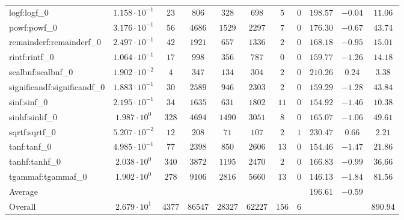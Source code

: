 \begin{tabular}{|l|c|c|c|c|c|c|c|c|c|c|}
logf:logf\_0                 & $ 1.158 \cdot 10^{-1} $ & $ 23     $ & $ 806   $ & $ 328   $ & $ 698   $ & $ 5   $ & $ 0 $ & $ 198.57      $ & $ -0.04   $ & $ 11.06   $ \\
powf:powf\_0                 & $ 3.176 \cdot 10^{-1} $ & $ 56     $ & $ 4686  $ & $ 1529  $ & $ 2297  $ & $ 7   $ & $ 0 $ & $ 176.30      $ & $ -0.67   $ & $ 43.74   $ \\
remainderf:remainderf\_0     & $ 2.497 \cdot 10^{-1} $ & $ 42     $ & $ 1921  $ & $ 657   $ & $ 1336  $ & $ 2   $ & $ 0 $ & $ 168.18      $ & $ -0.95   $ & $ 15.01   $ \\
rintf:rintf\_0               & $ 1.064 \cdot 10^{-1} $ & $ 17     $ & $ 998   $ & $ 356   $ & $ 787   $ & $ 0   $ & $ 0 $ & $ 159.77      $ & $ -1.26   $ & $ 14.18   $ \\
scalbnf:scalbnf\_0           & $ 1.902 \cdot 10^{-2} $ & $ 4      $ & $ 347   $ & $ 134   $ & $ 304   $ & $ 2   $ & $ 0 $ & $ 210.26      $ & $ 0.24    $ & $ 3.38    $ \\
significandf:significandf\_0 & $ 1.883 \cdot 10^{-1} $ & $ 30     $ & $ 2589  $ & $ 946   $ & $ 2303  $ & $ 2   $ & $ 0 $ & $ 159.29      $ & $ -1.28   $ & $ 43.84   $ \\
sinf:sinf\_0                 & $ 2.195 \cdot 10^{-1} $ & $ 34     $ & $ 1635  $ & $ 631   $ & $ 1802  $ & $ 11  $ & $ 0 $ & $ 154.92      $ & $ -1.46   $ & $ 10.38   $ \\
sinhf:sinhf\_0               & $ 1.987 \cdot 10^{0}  $ & $ 328    $ & $ 4694  $ & $ 1490  $ & $ 3051  $ & $ 8   $ & $ 0 $ & $ 165.07      $ & $ -1.06   $ & $ 49.61   $ \\
sqrtf:sqrtf\_0               & $ 5.207 \cdot 10^{-2} $ & $ 12     $ & $ 208   $ & $ 71    $ & $ 107   $ & $ 2   $ & $ 1 $ & $ 230.47      $ & $ 0.66    $ & $ 2.21    $ \\
tanf:tanf\_0                 & $ 4.985 \cdot 10^{-1} $ & $ 77     $ & $ 2398  $ & $ 850   $ & $ 2606  $ & $ 13  $ & $ 0 $ & $ 154.46      $ & $ -1.47   $ & $ 21.86   $ \\
tanhf:tanhf\_0               & $ 2.038 \cdot 10^{0}  $ & $ 340    $ & $ 3872  $ & $ 1195  $ & $ 2470  $ & $ 2   $ & $ 0 $ & $ 166.83      $ & $ -0.99   $ & $ 36.66   $ \\
tgammaf:tgammaf\_0           & $ 1.902 \cdot 10^{0}  $ & $ 278    $ & $ 9106  $ & $ 2816  $ & $ 5660  $ & $ 13  $ & $ 0 $ & $ 146.13      $ & $ -1.84   $ & $ 81.56   $ \\
\hline
Average                      & $                     $ & $        $ & $       $ & $       $ & $       $ & $     $ & $   $ & $ 196.61      $ & $ -0.59   $ & $         $ \\
\hline
Overall                      & $ 2.679 \cdot 10^{1}  $ & $ 4377   $ & $ 86547 $ & $ 28327 $ & $ 62227 $ & $ 156 $ & $ 6 $ & $             $ & $         $ & $ 890.94  $ \\
\hline
\end{tabular}
